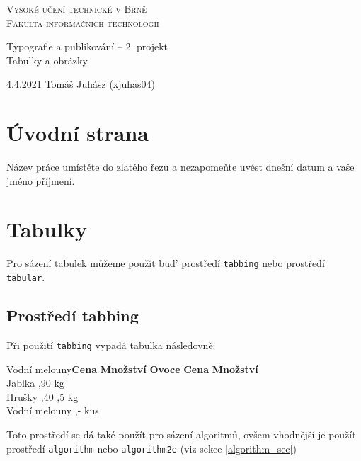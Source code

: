 \documentclass[a4paper,11pt]{article}
\begin{document}
\begin{titlepage}

\begin{center}
    \Huge
        \textsc{Vysoké učení technické v Brně}\\
    \huge
        \textsc {Fakulta informačních technologií} 

    \LARGE
        Typografie a publikování -- 2. projekt \\
    \Huge
        Tabulky a obrázky \\
\end{center}

{\LARGE 4.4.2021 \hfill
Tomáš Juhász (xjuhas04)}
\end{titlepage}

\section{Úvodní strana}
    Název práce umístěte do zlatého řezu a nezapomeňte uvést dnešní datum a vaše jméno příjmení.
\section{Tabulky}
    Pro sázení tabulek můžeme použít bud’ prostředí \texttt{tabbing} nebo prostředí \texttt{tabular}.
    \subsection{Prostředí tabbing}
        Při použití \texttt{tabbing} vypadá tabulka následovně:
        \begin{tabbing}
                Vodní melouny\quad \=\textbf{Cena} \quad \= \textbf{Množství}  \quad  \kill
                \textbf{Ovoce}    \> \textbf{Cena}    \> \textbf{Množství}  \\
                Jablka            ,90             kg     \\
                Hrušky            ,40            ,5 kg   \\
                Vodní melouny     ,-              kus    \\
        \end{tabbing}
        Toto prostředí se dá také použít pro sázení algoritmů, ovšem vhodnější je použít prostředí \texttt{algorithm} nebo \texttt{algorithm2e} (viz sekce \ref{algorithm_sec})
\end{document}
